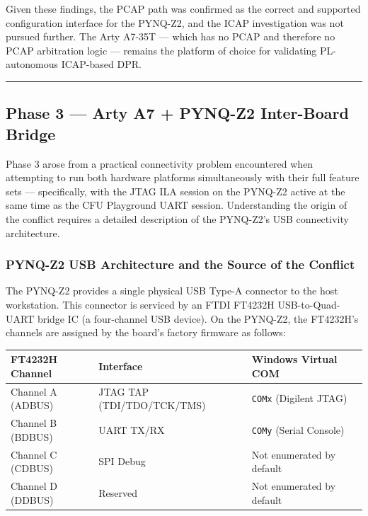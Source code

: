 Given these findings, the PCAP path was confirmed as the correct and supported configuration interface for the PYNQ-Z2, and the ICAP investigation was not pursued further. The Arty A7-35T — which has no PCAP and therefore no PCAP arbitration logic — remains the platform of choice for validating PL-autonomous ICAP-based DPR.

\vspace{0.4em}\hrule\vspace{0.4em}

\subsection{Phase 3 — Arty A7 + PYNQ-Z2 Inter-Board Bridge}

Phase 3 arose from a practical connectivity problem encountered when attempting to run both hardware platforms simultaneously with their full feature sets — specifically, with the JTAG ILA session on the PYNQ-Z2 active at the same time as the CFU Playground UART session. Understanding the origin of the conflict requires a detailed description of the PYNQ-Z2's USB connectivity architecture.

\subsubsection{PYNQ-Z2 USB Architecture and the Source of the Conflict}

The PYNQ-Z2 provides a single physical USB Type-A connector to the host workstation. This connector is serviced by an FTDI FT4232H USB-to-Quad-UART bridge IC (a four-channel USB device). On the PYNQ-Z2, the FT4232H's channels are assigned by the board's factory firmware as follows:

\begin{table}[htbp]
\centering
\begin{tabularx}{\textwidth}{X X X X}
\toprule
FT4232H Channel & Interface & Windows Virtual COM \\
\midrule
Channel A (ADBUS) & JTAG TAP (TDI/TDO/TCK/TMS) & \texttt{COMx} (Digilent JTAG) \\
Channel B (BDBUS) & UART TX/RX & \texttt{COMy} (Serial Console) \\
Channel C (CDBUS) & SPI Debug & Not enumerated by default \\
Channel D (DDBUS) & Reserved & Not enumerated by default \\
\bottomrule
\end{tabularx}
\end{table}

